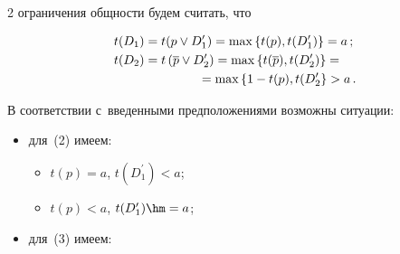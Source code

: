 \begin{multicols}{2}
ограничения общности будем считать, что


  \begin{align}


  t(D_1) &= t(p\vee D_1^\prime)=\max \left\{ t(p),t(D_1^\prime)\right\}=a\,;


  \label{e2-les}\\


  t(D_2) &= t\left( \overline{p} \vee D_2^\prime\right) =\max \left\{ t(\overline{p}), 


t(D_2^\prime) \right\} ={}\notag\\


&\hspace*{15mm}{}=\max \left\{ 1-t(p), t(D_2^\prime\right\}>a\,.


  \label{e3-les}


  \end{align}


  


  В соответствии с~введенными предположениями возможны ситуации:


  \begin{itemize}


\item  для~(2) имеем:


\begin{itemize}


\item[(а)] $t(p)=a$, $t(D_1^\prime) <a$; 


\item[(б)] $t(p)<a$,  $t(D_1^\prime)\hm=a$;


\end{itemize}


  \item


  для~(3) имеем: 


  \begin{itemize}


  \item[(в)] $\left[    \begin{matrix} 


  (\mathrm{в}1)~a<t(D_2^\prime)<1-t(p);\\


  (\mathrm{в}2)~t(D_2^\prime) <a<1-t(p);


  \end{matrix}


  \right]$


\item[(г)] $\left[   \begin{matrix}



\end{matrix}
\end{itemize}
\end{itemize}
\end{multicols}
